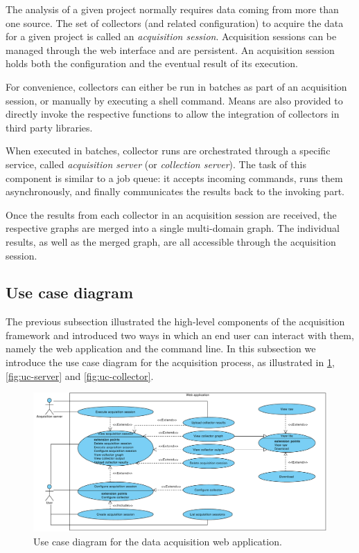 The analysis of a given project normally requires data coming from more than one source. The set of collectors (and related configuration) to acquire the data for a given project is called an \emph{acquisition session}. Acquisition sessions can be managed through the web interface and are persistent. An acquisition session holds both the configuration and the eventual result of its execution.

For convenience, collectors can either be run in batches as part of an acquisition session, or manually by executing a shell command. Means are also provided to directly invoke the respective functions to allow the integration of collectors in third party libraries.

When executed in batches, collector runs are orchestrated through a specific service, called \emph{acquisition server} (or \emph{collection server}). The task of this component is similar to a job queue: it accepts incoming commands, runs them asynchronously, and finally communicates the results back to the invoking part.

Once the results from each collector in an acquisition session are received, the respective graphs are merged into a single multi-domain graph. The individual results, as well as the merged graph, are all accessible through the acquisition session.

\subsection{Use case diagram}

The previous subsection illustrated the high-level components of the acquisition framework and introduced two ways in which an end user can interact with them, namely the web application and the command line. In this subsection we introduce the use case diagram for the acquisition process, as illustrated in \ref{fig:uc-acquisition}, \ref{fig:uc-server} and \vref{fig:uc-collector}.

\begin{figure}[p]
  \begin{adjustwidth}{-2.2cm}{-1.5cm}
  \includegraphics[width=\linewidth]{images/diagrams/uc-acquisition}
  \end{adjustwidth}

  \caption[Use case diagram for the data acquisition web application.]{Use case diagram for the data acquisition web application.}
  \label{fig:uc-acquisition}
\end{figure}

